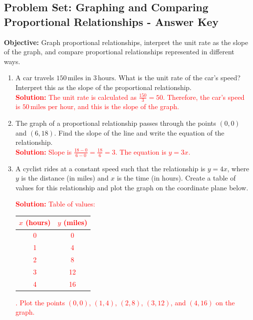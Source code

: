 \documentclass[12pt]{article}
\title{}
\date{}
\begin{document}
\subsection*{Problem Set: Graphing and Comparing Proportional Relationships - Answer Key}
\onehalfspacing

\begin{tcolorbox}[colframe=black!40, colback=gray!5, 
coltitle=black, colbacktitle=black!20, fonttitle=\bfseries\Large, 
title=Learning Objective, halign title=center, left=5pt, right=5pt, top=5pt, bottom=15pt]
\textbf{Objective:} Graph proportional relationships, interpret the unit rate as the slope of the graph, and compare proportional relationships represented in different ways.
\end{tcolorbox}

\begin{tcolorbox}[colframe=black!60, colback=white, 
coltitle=black, colbacktitle=black!15, fonttitle=\bfseries\Large, 
title=Exercises: Unit Rate and Slope, halign title=center, left=10pt, right=10pt, top=10pt, bottom=60pt]
\begin{enumerate}[itemsep=3em]
    \item A car travels \(150 \, \text{miles}\) in \(3 \, \text{hours}\). What is the unit rate of the car's speed? Interpret this as the slope of the proportional relationship.\\
    \textcolor{red}{\textbf{Solution:} The unit rate is calculated as \(\frac{150}{3} = 50\). Therefore, the car's speed is \(50 \, \text{miles per hour}\), and this is the slope of the graph.}

    \item The graph of a proportional relationship passes through the points \((0, 0)\) and \((6, 18)\). Find the slope of the line and write the equation of the relationship.\\
    \textcolor{red}{\textbf{Solution:} Slope is \(\frac{18 - 0}{6 - 0} = \frac{18}{6} = 3\). The equation is \(y = 3x\).}

    \item A cyclist rides at a constant speed such that the relationship is \(y = 4x\), where \(y\) is the distance (in miles) and \(x\) is the time (in hours). Create a table of values for this relationship and plot the graph on the coordinate plane below.\\
    \textcolor{red}{\textbf{Solution:} Table of values: 
    \begin{tabular}{|c|c|}
        \hline
        \(x\) (hours) & \(y\) (miles) \\ \hline
        0 & 0 \\ \hline
        1 & 4 \\ \hline
        2 & 8 \\ \hline
        3 & 12 \\ \hline
        4 & 16 \\ \hline
    \end{tabular}. Plot the points \((0, 0)\), \((1, 4)\), \((2, 8)\), \((3, 12)\), and \((4, 16)\) on the graph.}
\end{enumerate}
\end{tcolorbox}
\end{document}
